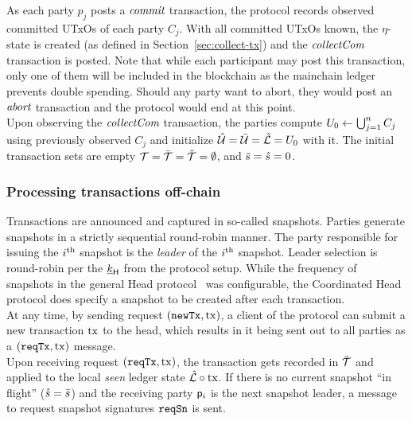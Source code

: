 \quad As each party $p_{j}$ posts a
$\textit{commit}$ transaction, the protocol records observed committed UTxOs of each
party $C_j$. With all committed UTxOs known, the $\eta$-state is created (as
defined in Section~\ref{sec:collect-tx}) and the $\textit{collectCom}$ transaction is
posted. Note that while each participant may post this transaction, only one of
them will be included in the blockchain as the mainchain ledger prevents double
spending. Should any party want to abort, they would post an $\textit{abort}$
transaction and the protocol would end at this point.\\

\quad Upon observing the $\textit{collectCom}$
transaction, the parties compute $U_{0} \gets \bigcup_{j=1}^{n} C_j$ using
previously observed $C_j$ and initialize $\hat {\mathcal U} = \bar {\mathcal U} = \hat {\mathcal L} = U_{0}$
with it. The initial transaction sets are empty
${\mathcal T} = \bar {\mathcal T} =\hat {\mathcal T} =\emptyset$, and $\bar s = \hat s = 0$.

\subsubsection{Processing transactions off-chain}

Transactions are announced and captured in so-called snapshots. Parties generate
snapshots in a strictly sequential round-robin manner. The party responsible for
issuing the $i^{\text{th}}$ snapshot is the \emph{leader} of the $i^{\text{th}}$ snapshot.
Leader selection is round-robin per the $\underline{k}_{\mathsf{H}}$ from the protocol setup.
While the frequency of snapshots in the general Head protocol~\cite{hydrahead20}
was configurable, the Coordinated Head protocol does specify a snapshot to be
created after each transaction.\\

\quad At any time, by sending request $(\mathtt{newTx},\mathrm{tx})$, a
client of the protocol can submit a new transaction $\mathrm{tx}$ to the head, which
results in it being sent out to all parties as a $(\mathtt{reqTx},\mathrm{tx})$ message.\\

\quad Upon receiving request $(\mathtt{reqTx},\mathrm{tx})$, the transaction
gets recorded in $\bar {\mathcal T}$ and applied to the local \emph{seen} ledger state
$\hat {\mathcal L} \circ \mathrm{tx}$. If there is no current snapshot ``in flight''
($\hat s = \bar s$) and the receiving party $\mathsf p_{i}$ is the next snapshot
leader, a message to request snapshot signatures $\mathtt{reqSn}$ is sent. \\

